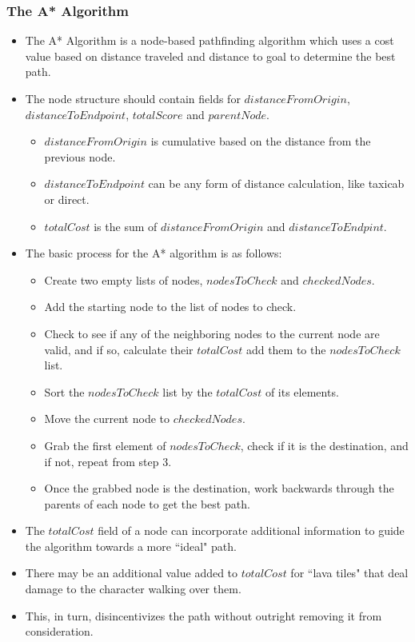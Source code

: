 \documentclass{article}
\begin{document}
\subsubsection{The A* Algorithm}
\begin{itemize}
    \item The A* Algorithm is a node-based pathfinding algorithm which uses a cost value based on distance traveled and distance to goal to determine the best path.
    \item The node structure should contain fields for $distanceFromOrigin$, $distanceToEndpoint$, $totalScore$ and $parentNode$.
    \begin{itemize}
        \item $distanceFromOrigin$ is cumulative based on the distance from the previous node.
        \item $distanceToEndpoint$ can be any form of distance calculation, like taxicab or direct.
        \item $totalCost$ is the sum of $distanceFromOrigin$ and $distanceToEndpint$.
    \end{itemize}
    \item The basic process for the A* algorithm is as follows:
    \begin{itemize}
        \item Create two empty lists of nodes, $nodesToCheck$ and $checkedNodes$.
        \item Add the starting node to the list of nodes to check.
        \item Check to see if any of the neighboring nodes to the current node are valid, and if so, calculate their $totalCost$ add them to the $nodesToCheck$ list.
        \item Sort the $nodesToCheck$ list by the $totalCost$ of its elements.
        \item Move the current node to $checkedNodes$.
        \item Grab the first element of $nodesToCheck$, check if it is the destination, and if not, repeat from step 3.
        \item Once the grabbed node is the destination, work backwards through the parents of each node to get the best path.
    \end{itemize}
    \item The $totalCost$ field of a node can incorporate additional information to guide the algorithm towards a more ``ideal" path.
    \item There may be an additional value added to $totalCost$ for ``lava tiles" that deal damage to the character walking over them.
    \item This, in turn, disincentivizes the path without outright removing it from consideration.
\end{itemize}
\end{document}
